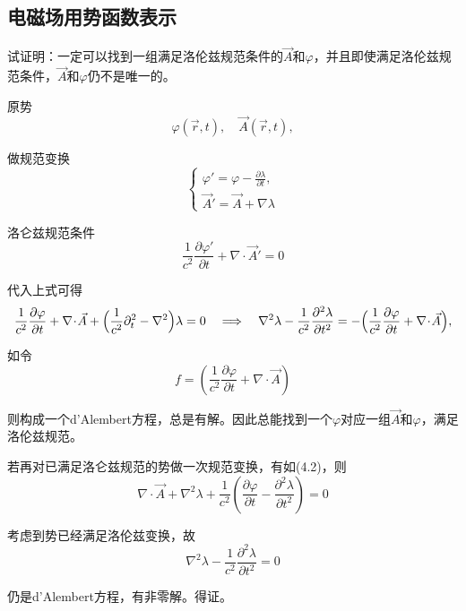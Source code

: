 \documentclass{template}
\begin{document}
\subsection{电磁场用势函数表示}
\begin{problem}
    试证明：一定可以找到一组满足洛伦兹规范条件的$\vec{A}$和$\varphi$，并且即使满足洛伦兹规范条件，$\vec{A}$和$\varphi$仍不是唯一的。
\end{problem}
\begin{solution}
原势
\begin{equation}
\varphi(\vec r,t),\quad \vec A(\vec r,t),
\end{equation}

做规范变换
\begin{equation}
\begin{cases}
\varphi' = \varphi - \displaystyle\frac{\partial\lambda}{\partial t},\\
\vec A' = \vec A + \nabla\lambda
\end{cases}
\end{equation}

洛仑兹规范条件
\begin{equation}
\frac{1}{c^2}\frac{\partial\varphi'}{\partial t} + \nabla\!\cdot\!\vec A' = 0
\end{equation}

代入上式可得
\begin{equation}
\frac{1}{c^2}\frac{\partial\varphi}{\partial t}
+ \nabla\!\cdot\!\vec A
+ \Bigl(\frac{1}{c^2}\partial_t^2 - \nabla^2\Bigr)\lambda
= 0
\quad\Longrightarrow\quad
\nabla^2\lambda-\frac{1}{c^2}\frac{\partial^2\lambda}{\partial t^2} = -\Bigl(\frac{1}{c^2}\frac{\partial \varphi}{\partial t} + \nabla\!\cdot\!\vec A\Bigr),
\end{equation}

如令
\begin{equation}
f=(\frac{1}{c^2}\frac{\partial \varphi}{\partial t} + \nabla\!\cdot\!\vec A)
\end{equation}

则构成一个d'Alembert方程，总是有解。因此总能找到一个$\varphi$对应一组$\vec{A}$和$\varphi$，满足洛伦兹规范。


若再对已满足洛仑兹规范的势做一次规范变换，有如(4.2)，则
\begin{equation}
    \nabla\cdot\vec{A}+\nabla^2\lambda+\frac{1}{c^2}(\frac{\partial \varphi}{\partial t}-\frac{\partial^2\lambda}{\partial t^2})=0
\end{equation}

考虑到势已经满足洛伦兹变换，故
\begin{equation}
    \nabla^2\lambda-\frac{1}{c^2}\frac{\partial^2\lambda}{\partial t^2} =0
\end{equation}

仍是d'Alembert方程，有非零解。得证。
\end{solution}
\end{document}
